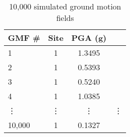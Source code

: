 \begin{table}[htbp]

\centering
\begin{tabular}{ l c c l }

\hline
\rowcolor{anti-flashwhite}
\bf{GMF \#} & \bf{Site} & \bf{PGA (g)}\\
\hline
1 & 1 & 1.3495 \\
2 & 1 & 0.5393 \\
3 & 1 & 0.5240 \\
4 & 1 & 1.0385 \\
\vdots & \vdots & \vdots & \vdots \\
10,000 & 1 & 0.1327 \\
\hline
\end{tabular}

\caption{10,000 simulated ground motion fields}
\label{tab:gmfs-sim-l1-10000}
\end{table}